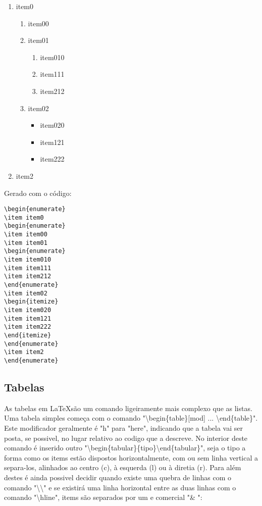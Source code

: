\begin{enumerate}
\item item0
\begin{enumerate}
\item item00
\item item01
\begin{enumerate}
\item item010
\item item111
\item item212
\end{enumerate}
\item item02
\begin{itemize}
\item item020
\item item121
\item item222
\end{itemize}
\end{enumerate}
\item item2
\end{enumerate}

Gerado com o código:
\begin{verbatim}
\begin{enumerate}
\item item0
\begin{enumerate}
\item item00
\item item01
\begin{enumerate}
\item item010
\item item111
\item item212
\end{enumerate}
\item item02
\begin{itemize}
\item item020
\item item121
\item item222
\end{itemize}
\end{enumerate}
\item item2
\end{enumerate}
\end{verbatim}

\subsection{Tabelas}
As tabelas em \LaTeX são um comando ligeiramente mais complexo que as listas. Uma tabela simples começa com o comando "\textbackslash begin\{table\}[mod] ... \textbackslash end\{table\}". Este modificador geralmente é "h" para "here", indicando que a tabela vai ser posta, se possivel, no lugar relativo ao codigo que a descreve. No interior deste comando é inserido outro "\textbackslash begin\{tabular\}\{tipo\}\textbackslash end\{tabular\}", seja o tipo a forma como os items estão dispostos horizontalmente, com ou sem linha vertical a separa-los, alinhados ao centro (c), à esquerda (l) ou à diretia (r). Para além destes é ainda possivel decidir quando existe uma quebra de linhas com o comando "\textbackslash \textbackslash" e se existirá uma linha horizontal entre as duas linhas com o comando "\textbackslash hline", items são separados por um e comercial "\& ":

